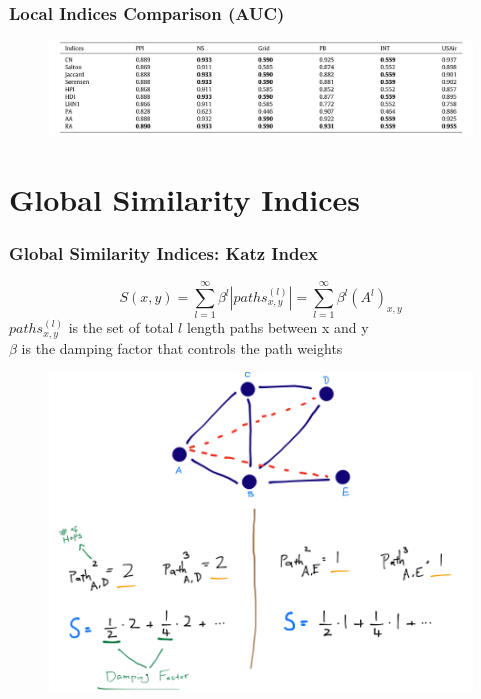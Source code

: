 \documentclass{beamer}
\begin{document}
\begin{frame}
\frametitle{Local Indices Comparison (AUC)}
\begin{figure}
  \centering
  \includegraphics[width=1\linewidth]{andrea_images/table1.jpg}
  \label{fig:table1}
\end{figure}
\end{frame}



\section{Global Similarity Indices}
\begin{frame}
  \frametitle{Global Similarity Indices: Katz Index}
    \[S(x,y) = \sum_{l=1}^{\infty} \beta^{l} |paths_{x,y}^{(l)}| = \sum_{l=1}^{\infty} \beta^{l}(A^{l})_{x,y}\]
    $paths_{x,y}^{(l)}$ is the set of total $l$ length paths between x and y\\
    $\beta$ is the damping factor that controls the path weights

\begin{figure}
\centering
  \includegraphics[width=.6\linewidth]{katz-graph.png}
  \label{fig:katz-graph}
\end{figure}

\end{frame}
\end{document}

